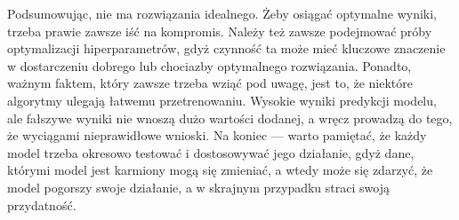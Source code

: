 \bigskip
\noindent Podsumowując, nie ma rozwiązania idealnego. Żeby osiągać optymalne wyniki, trzeba prawie zawsze iść na kompromis. Należy też zawsze podejmować próby optymalizacji hiperparametrów, gdyż czynność ta może mieć kluczowe znaczenie w dostarczeniu dobrego lub chociazby optymalnego rozwiązania. Ponadto, ważnym faktem, który zawsze trzeba wziąć pod uwagę, jest to, że niektóre algorytmy ulegają łatwemu przetrenowaniu. Wysokie wyniki predykcji modelu, ale fałszywe wyniki nie wnoszą dużo wartości dodanej, a wręcz prowadzą do tego, że wyciągami nieprawidłowe wnioski. Na koniec --- warto pamiętać, że każdy model trzeba okresowo testować i dostosowywać jego działanie, gdyż dane, którymi model jest karmiony mogą się zmieniać, a wtedy może się zdarzyć, że model pogorszy swoje działanie, a w skrajnym przypadku straci swoją przydatność.